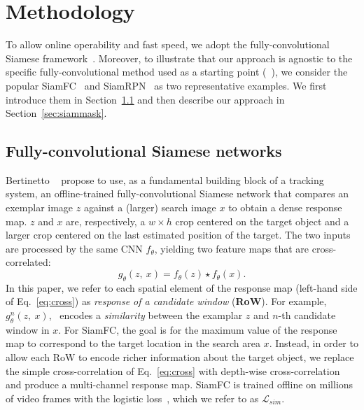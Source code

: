 \section{Methodology}
\label{sec:method}
To allow online operability and fast speed, we adopt the fully-convolutional Siamese framework~\cite{bertinetto2016fully}.
Moreover, to illustrate that our approach is agnostic to the specific fully-convolutional method used as a starting point (\eg~\cite{bertinetto2016fully,SiamRPN,zhu2018distractor,yang2018learning,he2018twofold}), we consider the popular SiamFC~\cite{bertinetto2016fully} and SiamRPN~\cite{SiamRPN} as two representative examples.
We first introduce them in Section~\ref{sec:fc} and then describe our approach in Section~\ref{sec:siammask}.

\subsection{Fully-convolutional Siamese networks}
\label{sec:fc}
Bertinetto \etal~\cite{bertinetto2016fully} propose to use, as a fundamental building block of a tracking system, an offline-trained fully-convolutional Siamese network that compares an exemplar image $z$ against a (larger) search image $x$ to obtain a dense response map.
$z$ and $x$ are, respectively, a $w{\times}h$ crop centered on the target object  and a larger crop centered on the last estimated position of the target.
The two inputs are processed by the same CNN $f_{\theta}$, yielding two feature maps that are cross-correlated:
\begin{equation}\label{eq:cross}
g_{\theta}(z,~x) = f_{\theta}(z) \star f_{\theta}(x).
\end{equation}
In this paper, we refer to each spatial element of the response map (left-hand side of Eq.~\ref{eq:cross}) as \emph{response of a candidate window} (\textbf{RoW}).
For example, ~$g_{\theta}^{n}(z,~x)$, ~encodes a \textit{similarity} between the examplar $z$ and $n$-th candidate window in $x$.
For SiamFC, the goal is for the maximum value of the response map to correspond to the target location in the search area $x$.
Instead, in order to allow each RoW to encode richer information about the target object, we replace the simple cross-correlation of Eq.~\ref{eq:cross} with depth-wise cross-correlation~\cite{bertinetto2016learning} and produce a multi-channel response map.
SiamFC is trained offline on millions of video frames with the logistic loss~\cite[Section 2.2]{bertinetto2016fully}, which we refer to as $\mathcal{L}_{sim}$.

